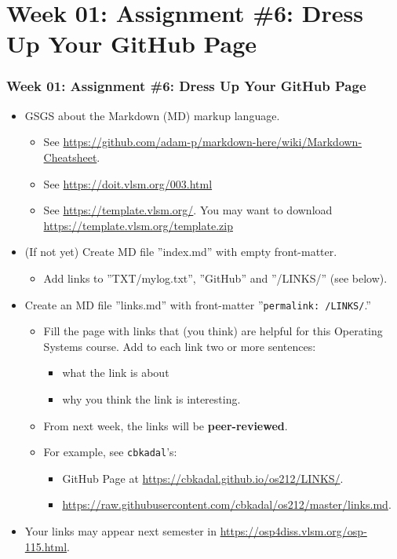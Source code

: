\documentclass[xcolor=table, notheorems, hyperref={pdfpagelabels=false}]{beamer}
\begin{document}
\section{Week 01: Assignment \#6: Dress Up Your GitHub Page}
\begin{frame}[fragile]
\frametitle{Week 01: Assignment \#6: Dress Up Your GitHub Page}
\begin{itemize}
\item GSGS about the Markdown (MD) markup language.
\begin{itemize}
\item See {\scriptsize \url{https://github.com/adam-p/markdown-here/wiki/Markdown-Cheatsheet}.}
\item See \url{https://doit.vlsm.org/003.html}
\item See \url{https://template.vlsm.org/}. 
      You may want to download \url{https://template.vlsm.org/template.zip}
\end{itemize}
\item (If not yet) Create MD file ''index.md'' with empty front-matter.
\begin{itemize}
\item Add links to ''TXT/mylog.txt'', ''GitHub'' and ''/LINKS/'' (see below).
\end{itemize}
\item Create an MD file ''links.md'' with front-matter {\scriptsize ''\texttt{permalink: /LINKS/}.''}
\begin{itemize}
\item Fill the page with links that (you think) are helpful for this Operating Systems course.
      Add to each link two or more sentences:
\begin{itemize}
\item what the link is about
\item why you think the link is interesting.
\end{itemize}
\item From next week, the links will be \textbf{peer-reviewed}.
\item For example, see \texttt{cbkadal}'s:
\begin{itemize}
\item GitHub Page at \url{https://cbkadal.github.io/os212/LINKS/}.
\item {\scriptsize \url{https://raw.githubusercontent.com/cbkadal/os212/master/links.md}}.
\end{itemize}
\end{itemize}
\item Your links may appear next semester in \url{https://osp4diss.vlsm.org/osp-115.html}.
\end{itemize}
\end{frame}
\end{document}

